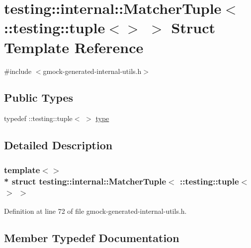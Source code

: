 \hypertarget{structtesting_1_1internal_1_1_matcher_tuple_3_01_1_1testing_1_1tuple_3_4_01_4}{}\section{testing\+:\+:internal\+:\+:Matcher\+Tuple$<$ \+:\+:testing\+:\+:tuple$<$$>$ $>$ Struct Template Reference}
\label{structtesting_1_1internal_1_1_matcher_tuple_3_01_1_1testing_1_1tuple_3_4_01_4}


{\ttfamily \#include $<$gmock-\/generated-\/internal-\/utils.\+h$>$}

\subsection*{Public Types}
\begin{DoxyCompactItemize}
\item 
typedef \+::testing\+::tuple$<$  $>$ \hyperlink{structtesting_1_1internal_1_1_matcher_tuple_3_01_1_1testing_1_1tuple_3_4_01_4_a8d4493b2b299322e6c885dee5473ebd7}{type}
\end{DoxyCompactItemize}


\subsection{Detailed Description}
\subsubsection*{template$<$$>$\\*
struct testing\+::internal\+::\+Matcher\+Tuple$<$ \+::testing\+::tuple$<$$>$ $>$}



Definition at line 72 of file gmock-\/generated-\/internal-\/utils.\+h.



\subsection{Member Typedef Documentation}
